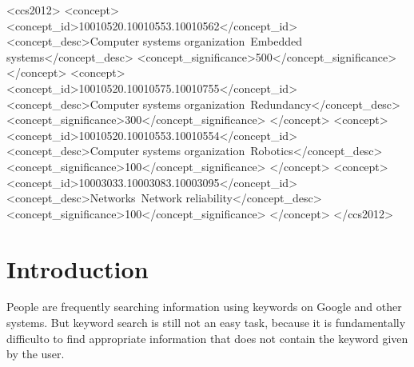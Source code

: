 \documentclass[manuscript,anonymous,review]{acmart}
\begin{document}
\begin{CCSXML}
<ccs2012>
 <concept>
  <concept_id>10010520.10010553.10010562</concept_id>
  <concept_desc>Computer systems organization~Embedded systems</concept_desc>
  <concept_significance>500</concept_significance>
 </concept>
 <concept>
  <concept_id>10010520.10010575.10010755</concept_id>
  <concept_desc>Computer systems organization~Redundancy</concept_desc>
  <concept_significance>300</concept_significance>
 </concept>
 <concept>
  <concept_id>10010520.10010553.10010554</concept_id>
  <concept_desc>Computer systems organization~Robotics</concept_desc>
  <concept_significance>100</concept_significance>
 </concept>
 <concept>
  <concept_id>10003033.10003083.10003095</concept_id>
  <concept_desc>Networks~Network reliability</concept_desc>
  <concept_significance>100</concept_significance>
 </concept>
</ccs2012>
\end{CCSXML}




\maketitle

\section{Introduction}

People are frequently searching information using keywords on Google
and other systems.
But keyword search is still not an easy task,
because it is fundamentally difficulto to find appropriate information
that does not contain the keyword given by the user.

\end{document}
